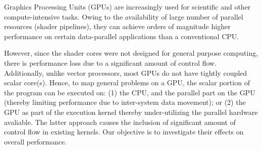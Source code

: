 
\par{Graphics Processing Units (GPUs) are increasingly used for scientific and other compute-intensive tasks. Owing to the availability of large number of parallel resources (shader pipelines), they can achieve orders of magnitude higher performance on certain data-parallel applications than a conventional CPU.
}

\par{
However, since the shader cores were not designed for general purpose computing, there is performance loss due to a significant amount of control flow. Additionally, unlike vector processors, most GPUs do not have tightly coupled scalar core(s). Hence, to map general problems on a GPU, the scalar portion of the program can be executed on: (1) the CPU, and the parallel part on the GPU (thereby limiting performance due to inter-system data movement); or (2) the GPU as part of the execution kernel thereby under-utilizing the parallel hardware avaliable. The latter approach causes the inclusion of significant amount of control flow in existing kernels. Our objective is to investigate their effects on overall performance.}
